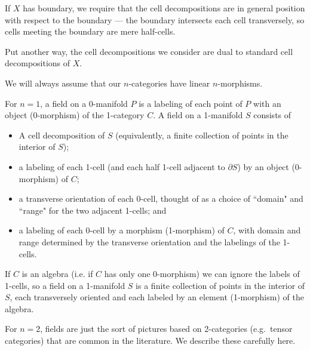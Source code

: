 \documentclass[11pt,leqno]{amsart}
\def\bd{\partial}
\begin{document}
If $X$ has boundary, we require that the cell decompositions are in general
position with respect to the boundary --- the boundary intersects each cell
transversely, so cells meeting the boundary are mere half-cells.

Put another way, the cell decompositions we consider are dual to standard cell
decompositions of $X$.

We will always assume that our $n$-categories have linear $n$-morphisms.

For $n=1$, a field on a 0-manifold $P$ is a labeling of each point of $P$ with
an object (0-morphism) of the 1-category $C$.
A field on a 1-manifold $S$ consists of
\begin{itemize}
    \item A cell decomposition of $S$ (equivalently, a finite collection
of points in the interior of $S$);
    \item a labeling of each 1-cell (and each half 1-cell adjacent to $\bd S$)
by an object (0-morphism) of $C$;
    \item a transverse orientation of each 0-cell, thought of as a choice of
``domain" and ``range" for the two adjacent 1-cells; and
    \item a labeling of each 0-cell by a morphism (1-morphism) of $C$, with
domain and range determined by the transverse orientation and the labelings of the 1-cells.
\end{itemize}

If $C$ is an algebra (i.e. if $C$ has only one 0-morphism) we can ignore the labels
of 1-cells, so a field on a 1-manifold $S$ is a finite collection of points in the
interior of $S$, each transversely oriented and each labeled by an element (1-morphism)
of the algebra.

\medskip

For $n=2$, fields are just the sort of pictures based on 2-categories (e.g.\ tensor categories)
that are common in the literature.
We describe these carefully here.
\end{document}
